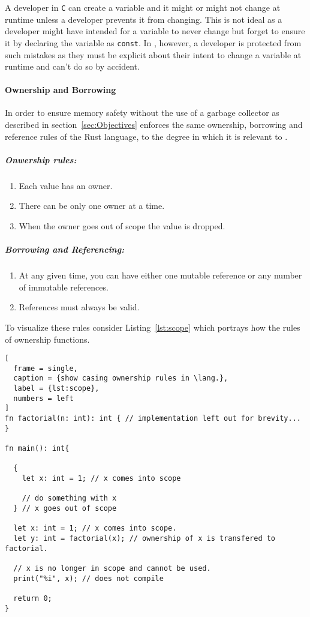 A developer in \texttt{C} can create a variable and it might or might not change at
runtime unless a developer prevents it from changing. This is not ideal as a
developer might have intended for a variable to never change but forget to ensure it
by declaring the variable as \texttt{const}. In \lang, however, a developer is protected from
such mistakes as they must be explicit about their intent to change a variable at
runtime and can't do so by accident.

\paragraph{Ownership and Borrowing} \hfill 
\label{par:Ownership}

In order to ensure memory safety without the use of a garbage collector as described
in section~\ref{sec:Objectives} \lang{} enforces the same ownership, borrowing and
reference rules of the Rust language, to the degree in which it is relevant to \lang.

\subparagraph{Onwership rules:}
\begin{enumerate}
  \item Each value has an owner\cite{RUST}. 
  \item There can be only one owner at a time\cite{RUST}. 
  \item When the owner goes out of scope the value is dropped\cite{RUST}.
\end{enumerate}

\subparagraph{Borrowing and Referencing:}
\label{par:borrowing}

\begin{enumerate}
  \item At any given time, you can have either one mutable reference or any number of
    immutable references\cite{RUST}.
  \item References must always be valid\cite{RUST}.
\end{enumerate}

To visualize these rules consider Listing~\ref{lst:scope} which portrays how the
rules of ownership functions.

\newpage

\begin{lstlisting}[
  frame = single,
  caption = {show casing ownership rules in \lang.},
  label = {lst:scope},
  numbers = left
]
fn factorial(n: int): int { // implementation left out for brevity... }

fn main(): int{
  
  {
    let x: int = 1; // x comes into scope

    // do something with x
  } // x goes out of scope

  let x: int = 1; // x comes into scope.
  let y: int = factorial(x); // ownership of x is transfered to factorial.

  // x is no longer in scope and cannot be used.
  print("%i", x); // does not compile

  return 0;
}
\end{lstlisting}

